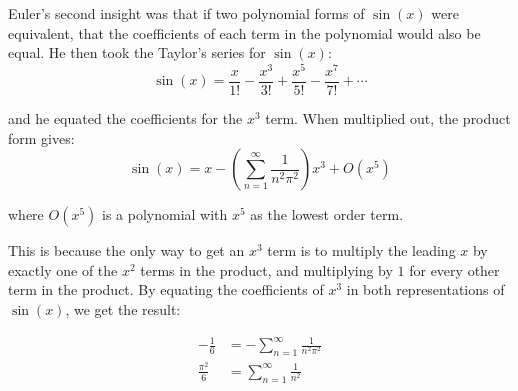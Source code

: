 \documentclass{article}
\begin{document}
Euler's second insight was that if two polynomial forms of $\sin(x)$ were equivalent, that the coefficients of each term in the polynomial would also be equal. He then took the Taylor's series for $\sin(x)$:
\[ \sin(x) = \frac{x}{1!} - \frac{x^3}{3!} + \frac{x^5}{5!} - \frac{x^7}{7!} + \cdots \]

and he equated the coefficients for the $x^3$ term. When multiplied out, the product form gives:
\[ \sin(x) = x - \left(\sum_{n=1}^{\infty} \frac{1}{n^2\pi^2}\right) x^3 + O(x^5) \]

where $O(x^5)$ is a polynomial with $x^5$ as the lowest order term.

This is because the only way to get an $x^3$ term is to multiply the leading $x$ by exactly one of the $x^2$ terms in the product, and multiplying by $1$ for every other term in the product. By equating the coefficients of $x^3$ in both representations of $\sin(x)$, we get the result:

\begin{align*}
    -\frac{1}{6} &= -\sum_{n=1}^{\infty} \frac{1}{n^2 \pi^2}\\
    \frac{\pi^2}{6} &= \sum_{n=1}^{\infty} \frac{1}{n^2} \\
\end{align*}
\end{document}
